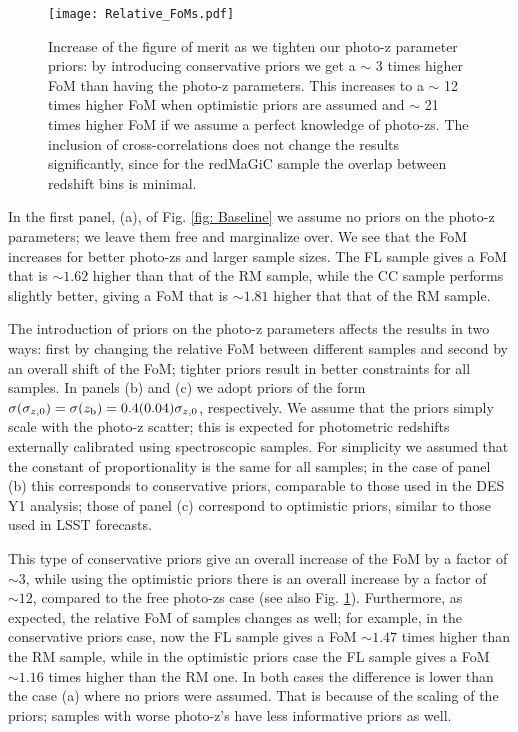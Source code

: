 \documentclass[a4paper,fleqn,usenatbib]{mnras}
\begin{document}
\begin{figure}
\centering
\texttt{[image: Relative\_FoMs.pdf]} 
\caption{Increase of the figure of merit as we tighten our photo-z parameter priors: by introducing conservative priors we get a $\sim$ 3 times higher FoM than having the photo-z parameters. This increases to a $\sim$ 12 times higher FoM when optimistic priors are assumed and $\sim$ 21 times higher FoM if we assume a perfect knowledge of photo-zs. The inclusion of cross-correlations does not change the results significantly, since for the redMaGiC sample the overlap between redshift bins is minimal.}
\label{fig: Norm_increase}
\end{figure}

In the first panel, (a), of Fig. \ref{fig: Baseline} we assume no priors on the photo-z parameters; we leave them free and marginalize over. We see that the FoM increases for better photo-zs and larger sample sizes. The FL sample gives a FoM that is $\sim 1.62$ higher than that of the RM sample, while the CC sample performs slightly better, giving a FoM that is $\sim 1.81$ higher that that of the RM sample.

The introduction of priors on the photo-z parameters affects the results in two ways: first by changing the relative FoM between different samples and second by an overall shift of the FoM; tighter priors result in better constraints for all samples. In panels (b) and (c) we adopt priors of the form $\sigma(\sigma_{z,0}) = \sigma(z_{\mbox{\scriptsize{b}}}) = 0.4(0.04)\sigma_{z,0}$, respectively. We assume that the priors simply scale with the photo-z scatter; this is expected for photometric redshifts externally calibrated using spectroscopic samples. For simplicity we assumed that the constant of proportionality is the same for all samples; in the case of panel (b) this corresponds to conservative priors, comparable to those used in the DES Y1 analysis; those of panel (c) correspond to optimistic priors, similar to those used in LSST forecasts.

This type of conservative priors give an overall increase of the FoM by a factor of $\sim 3$, while using the optimistic priors there is an overall increase by a factor of $\sim 12$, compared to the free photo-zs case (see also Fig. \ref{fig: Norm_increase}). Furthermore, as expected, the relative FoM of samples changes as well; for example, in the conservative priors case, now the FL sample gives a FoM $\sim 1.47$ times higher than the RM sample, while in the optimistic priors case the FL sample gives a FoM $\sim 1.16$ times higher than the RM one. In both cases the difference is lower than the case (a) where no priors were assumed. That is because of the scaling of the priors; samples with worse photo-z's have less informative priors as well.
\end{document}
